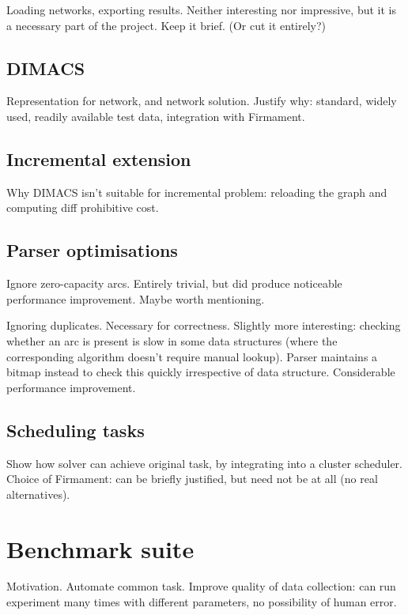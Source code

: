 Loading networks, exporting results. Neither interesting nor impressive, but it is a necessary part of the project. Keep it brief. (Or cut it entirely?)

\subsection{DIMACS}

Representation for network, and network solution. Justify why: standard, widely used, readily available test data, integration with Firmament. 

\subsection{Incremental extension}

Why DIMACS isn't suitable for incremental problem: reloading the graph and computing diff prohibitive cost. 

\subsection{Parser optimisations}

Ignore zero-capacity arcs. Entirely trivial, but did produce noticeable performance improvement. Maybe worth mentioning.

Ignoring duplicates. Necessary for correctness. Slightly more interesting: checking whether an arc is present is slow in some data structures (where the corresponding algorithm doesn't require manual lookup). Parser maintains a bitmap instead to check this quickly irrespective of data structure. Considerable performance improvement. 

\subsection{Scheduling tasks}

Show how solver can achieve original task, by integrating into a cluster scheduler. Choice of Firmament: can be briefly justified, but need not be at all (no real alternatives).

\section{Benchmark suite} \label{sec:impl-benchmark}


Motivation. Automate common task. Improve quality of data collection: can run experiment many times with different parameters, no possibility of human error. 

